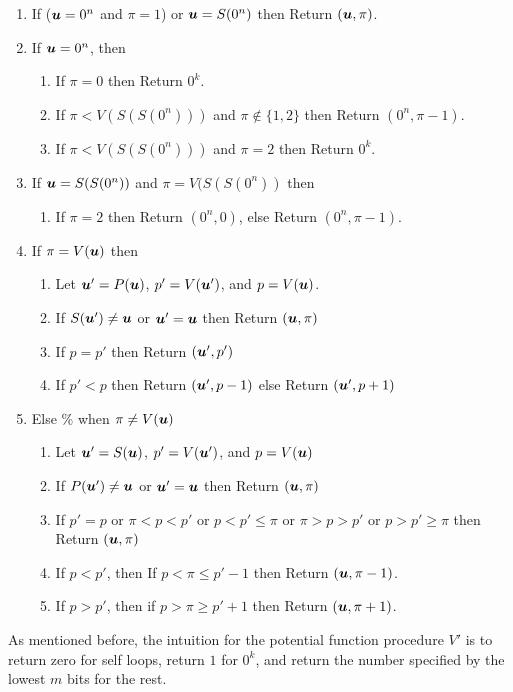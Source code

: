 \begin{enumerate}
\item If ($\mbox{\boldmath $u$}=0^n$ and $\pi=1$) or $\mbox{\boldmath $u$}=S(0^n)$ then Return $(\mbox{\boldmath $u$},\pi)$. 
\item If $\mbox{\boldmath $u$}=0^n$, then 
\begin{enumerate}
\item If $\pi=0$ then Return $0^k$.
\item If $\pi<V(S(S(0^n)))$ and $\pi\notin \{1,2\}$ then Return $(0^n,\pi-1)$.
\item If $\pi<V(S(S(0^n)))$ and $\pi=2$ then Return $0^k$.
\end{enumerate}
\item If $\mbox{\boldmath $u$}=S(S(0^n))$ and $\pi=V(S(S(0^n))$ then 
\begin{enumerate}
\item If $\pi=2$ then Return $(0^n,0)$, else Return $(0^n,\pi-1)$. 
\end{enumerate}
\item If $\pi=V(\mbox{\boldmath $u$})$ then 
\begin{enumerate}
\item Let $\mbox{\boldmath $u$}'=P(\mbox{\boldmath $u$})$, $p'=V(\mbox{\boldmath $u$}')$, and $p=V(\mbox{\boldmath $u$})$. 
\item If $S(\mbox{\boldmath $u$}')\neq \mbox{\boldmath $u$}$ or $\mbox{\boldmath $u$}'=\mbox{\boldmath $u$}$ then Return $(\mbox{\boldmath $u$},\pi)$
\item If $p=p'$ then Return $(\mbox{\boldmath $u$}',p')$ 
\item If $p'<p$ then Return $(\mbox{\boldmath $u$}',p-1)$ else Return $(\mbox{\boldmath $u$}',p+1)$
\end{enumerate}
\item Else \% when $\pi \neq V(\mbox{\boldmath $u$})$
\begin{enumerate}
\item Let $\mbox{\boldmath $u$}'=S(\mbox{\boldmath $u$})$, $p'=V(\mbox{\boldmath $u$}')$, and $p=V(\mbox{\boldmath $u$})$
\item If $P(\mbox{\boldmath $u$}')\neq \mbox{\boldmath $u$}$ or $\mbox{\boldmath $u$}'=\mbox{\boldmath $u$}$ then Return $(\mbox{\boldmath $u$},\pi)$
\item If $p'=p$ or $\pi<p< p'$ or $p<p'\le \pi$ or $\pi>p> p'$ or $p>p'\ge \pi$ then Return $(\mbox{\boldmath $u$},\pi)$
\item If $p<p'$, then If $p<\pi\le p'-1$ then Return $(\mbox{\boldmath $u$},\pi-1)$. 
\item If $p>p'$, then if $p> \pi\ge p'+1$ then Return $(\mbox{\boldmath $u$},\pi+1)$. 
\end{enumerate}
\end{enumerate}

As mentioned before, the intuition for the potential function procedure $V'$ is to return zero for self loops, return $1$ for $0^k$, and return the number specified by the lowest $m$ bits for the rest. 
\medskip
\medskip


